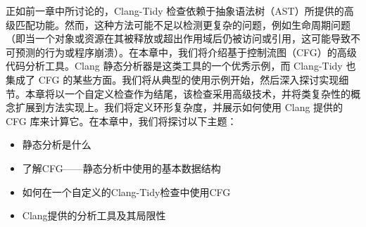 
正如前一章中所讨论的，Clang-Tidy 检查依赖于抽象语法树（AST）所提供的高级匹配功能。然而，这种方法可能不足以检测更复杂的问题，例如生命周期问题（即当一个对象或资源在其被释放或超出作用域后仍被访问或引用，这可能导致不可预测的行为或程序崩溃）。在本章中，我们将介绍基于控制流图（CFG）的高级代码分析工具。Clang 静态分析器是这类工具的一个优秀示例，而 Clang-Tidy 也集成了 CFG 的某些方面。我们将从典型的使用示例开始，然后深入探讨实现细节。本章将以一个自定义检查作为结尾，该检查采用高级技术，并将类复杂性的概念扩展到方法实现上。我们将定义环形复杂度，并展示如何使用 Clang 提供的 CFG 库来计算它。在本章中，我们将探讨以下主题：

\begin{itemize}
\item
静态分析是什么

\item
了解CFG——静态分析中使用的基本数据结构

\item
如何在一个自定义的Clang-Tidy检查中使用CFG

\item
Clang提供的分析工具及其局限性
\end{itemize}